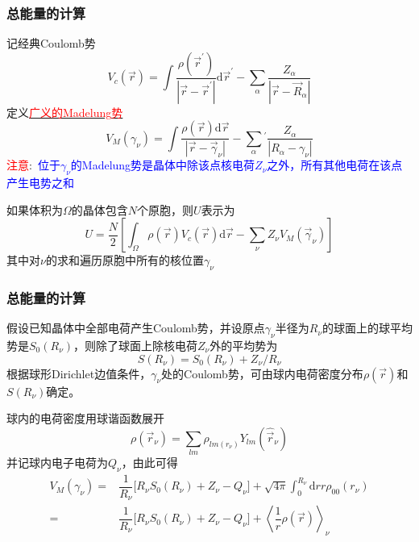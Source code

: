 \documentclass[cjk,slidestop,compress,mathserif,blue]{beamer}
\begin{document}
\frame
{
	\frametitle{总能量的计算}
	记经典\textrm{Coulomb}势
	\begin{displaymath}
		V_c(\vec r)=\int\dfrac{\rho(\vec r^{\prime})}{|\vec r-\vec r^{\prime}|}\mathrm{d}\vec r^{\prime}-\sum_{\alpha}\dfrac{Z_{\alpha}}{|\vec r-\vec R_{\alpha}|}
	\end{displaymath}
	定义\underline{\textcolor{red}{广义的\textrm{Madelung}势}}
	\begin{displaymath}
		V_M(\gamma_{\nu})=\int\dfrac{\rho(\vec r)\mathrm{d}\vec r}{|\vec r-\vec \gamma_{\nu}|}-\sum_{\alpha}{}^{\prime}\dfrac{Z_{\alpha}}{|R_{\alpha}-\gamma_{\nu}|}
	\end{displaymath}
	\textcolor{red}{注意}:~\textcolor{blue}{位于\textrm{$\gamma_{\nu}$的\textrm{Madelung}势是晶体中除该点核电荷$Z_{\nu}$之外，所有其他电荷在该点产生电势之和}}

	如果体积为$\Omega$的晶体包含$N$个原胞，则$U$表示为
	\begin{displaymath}
		U=\dfrac N2\left[\int_{\Omega}\rho(\vec r)V_c(\vec r)\mathrm{d}\vec r-\sum_{\nu}Z_{\nu}V_M(\vec \gamma_{\nu})\right]
	\end{displaymath}
	其中对$\nu$的求和遍历原胞中所有的核位置$\gamma_{\nu}$
}

\frame
{
	\frametitle{总能量的计算}
	假设已知晶体中全部电荷产生\textrm{Coulomb}势，并设原点$\gamma_{\nu}$半径为$R_{\nu}$的球面上的球平均势是$S_0(R_{\nu})$，则除了球面上除核电荷$Z_{\nu}$外的平均势为
	\begin{displaymath}
		S(R_{\nu})=S_0(R_{\nu})+Z_{\nu}/R_{\nu}
	\end{displaymath}
	根据球形\textrm{Dirichlet}边值条件，$\gamma_{\nu}$处的\textrm{Coulomb}势，可由球内电荷密度分布$\rho(\vec r)$和$S(R_{\nu})$确定。

	球内的电荷密度用球谐函数展开
	\begin{displaymath}
		\rho(\vec r_{\nu})=\sum_{lm}\rho_{lm(r_{\nu})}Y_{lm}(\hat{\vec r}_{\nu})
	\end{displaymath}
	并记球内电子电荷为$Q_{\nu}$，由此可得
	\begin{displaymath}
		\begin{aligned}
			V_M(\gamma_{\nu})=&\dfrac1{R_{\nu}}\big[R_{\nu}S_0(R_{\nu})+Z_{\nu}-Q_{\nu}\big]+\sqrt{4\pi}\int_0^{R_{\nu}}\mathrm{d}rr\rho_{00}(r_{\nu})\\
			=&\dfrac1{R_{\nu}}\big[R_{\nu}S_0(R_{\nu})+Z_{\nu}-Q_{\nu}\big]+\left\langle\dfrac1r\rho(\vec r)\right\rangle_{\nu}
		\end{aligned}
	\end{displaymath}
}
\end{document}
